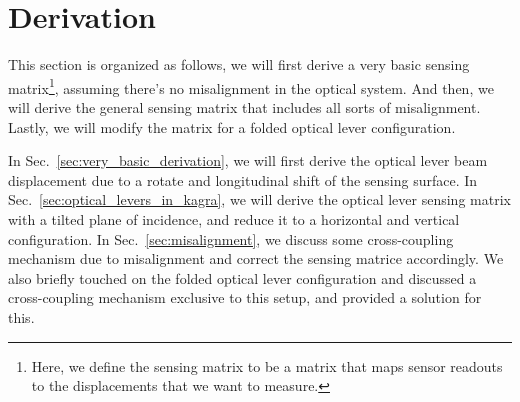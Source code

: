 \section{Derivation \label{sec:derivation}}
This section is organized as follows, we will first derive a very basic sensing matrix\footnote{Here, we define the sensing matrix to be a matrix that maps sensor readouts to the displacements that we want to measure.}, assuming there's no misalignment in the optical system.
And then, we will derive the general sensing matrix that includes all sorts of misalignment.
Lastly, we will modify the matrix for a folded optical lever configuration.

In Sec.~\ref{sec:very_basic_derivation}, we will first derive the optical lever beam displacement due to a rotate and longitudinal shift of the sensing surface. 
In Sec.~\ref{sec:optical_levers_in_kagra}, we will derive the optical lever sensing matrix with a tilted plane of incidence, and reduce it to a horizontal and vertical configuration.
In Sec.~\ref{sec:misalignment}, we discuss some cross-coupling mechanism due to misalignment and correct the sensing matrice accordingly.
We also briefly touched on the folded optical lever configuration and discussed a cross-coupling mechanism exclusive to this setup, and provided a solution for this.
